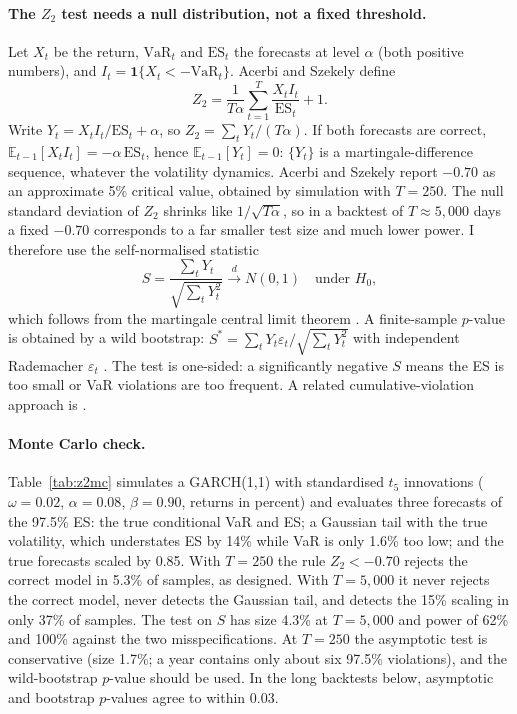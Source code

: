 \documentclass[11pt]{article}
\newcommand{\E}{\mathbb{E}}
\newcommand{\1}{\mathbf{1}}
\begin{document}
\paragraph{The $Z_2$ test needs a null distribution, not a fixed threshold.}
Let $X_t$ be the return, $\mathrm{VaR}_t$ and $\mathrm{ES}_t$ the forecasts at level $\alpha$ (both positive
numbers), and $I_t = \1\{X_t < -\mathrm{VaR}_t\}$. Acerbi and Szekely define
\begin{equation}
Z_2 = \frac{1}{T\alpha}\sum_{t=1}^{T}\frac{X_t I_t}{\mathrm{ES}_t} + 1 .
\end{equation}
Write $Y_t = X_t I_t/\mathrm{ES}_t + \alpha$, so $Z_2 = \sum_t Y_t/(T\alpha)$. If both forecasts are correct,
$\E_{t-1}[X_t I_t] = -\alpha\,\mathrm{ES}_t$, hence $\E_{t-1}[Y_t]=0$: $\{Y_t\}$ is a martingale-difference
sequence, whatever the volatility dynamics. Acerbi and Szekely report $-0.70$ as an approximate 5\% critical
value, obtained by simulation with $T=250$. The null standard deviation of $Z_2$ shrinks like
$1/\sqrt{T\alpha}$, so in a backtest of $T\approx 5{,}000$ days a fixed $-0.70$ corresponds to a far smaller
test size and much lower power. I therefore use the self-normalised statistic
\begin{equation}
S = \frac{\sum_t Y_t}{\sqrt{\sum_t Y_t^2}} \xrightarrow{d} N(0,1)\quad\text{under } H_0,
\end{equation}
which follows from the martingale central limit theorem \citep{hallheyde1980}. A finite-sample $p$-value is
obtained by a wild bootstrap: $S^{*} = \sum_t Y_t\varepsilon_t/\sqrt{\sum_t Y_t^2}$ with independent
Rademacher $\varepsilon_t$ \citep{wu1986,mammen1993}. The test is one-sided: a significantly negative $S$
means the ES is too small or VaR violations are too frequent. A related cumulative-violation approach is
\citet{duescanciano2017}.

\paragraph{Monte Carlo check.}
Table~\ref{tab:z2mc} simulates a GARCH(1,1) with standardised $t_5$ innovations
($\omega=0.02$, $\alpha=0.08$, $\beta=0.90$, returns in percent) and evaluates three forecasts of the 97.5\%
ES: the true conditional VaR and ES; a Gaussian tail with the true volatility, which understates ES by 14\%
while VaR is only 1.6\% too low; and the true forecasts scaled by 0.85. With $T=250$ the rule $Z_2<-0.70$
rejects the correct model in 5.3\% of samples, as designed. With $T=5{,}000$ it never rejects the correct
model, never detects the Gaussian tail, and detects the 15\% scaling in only 37\% of samples. The test on $S$
has size 4.3\% at $T=5{,}000$ and power of 62\% and 100\% against the two misspecifications. At $T=250$
the asymptotic test is conservative (size 1.7\%; a year contains only about six 97.5\% violations), and
the wild-bootstrap $p$-value should be used. In the long backtests below, asymptotic and bootstrap $p$-values
agree to within 0.03.
\end{document}
